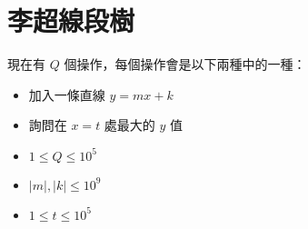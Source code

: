 \section{李超線段樹}

\begin{frame}{\ebtitle}
    \begin{problem}[動態凸包]
        現在有 $Q$ 個操作，每個操作會是以下兩種中的一種：

        \begin{itemize}
            \item 加入一條直線 $y = mx + k$
            \item 詢問在 $x = t$ 處最大的 $y$ 值
        \end{itemize}

        \begin{itemize}
            \item $1\le Q \le 10^5$
            \item $|m|, |k| \le 10^9$
            \item $1 \le t \le 10^5$
        \end{itemize}
    \end{problem}
\end{frame}

